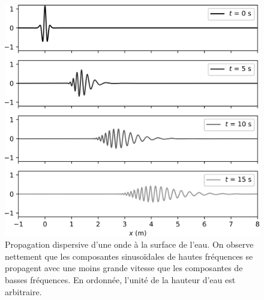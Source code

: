 \documentclass[../../main/main.tex]{subfiles}
\begin{document}
\begin{figure}[h!]
	\centering
	\includegraphics[width=\linewidth]{dispersion}
	\caption[Dispersion d'une onde à la surface de l'eau]{Propagation dispersive
		d'une onde à la surface de l'eau. On observe nettement que les
		composantes sinusoïdales de hautes fréquences se propagent avec une
		moins grande vitesse que les composantes de basses fréquences. En
		ordonnée, l'unité de la hauteur d'eau est arbitraire.}
	\label{fig:disp_eau}
\end{figure}
\end{document}
